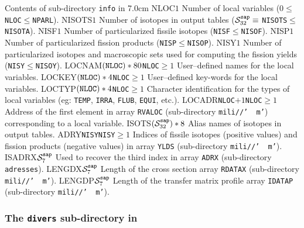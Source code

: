 \begin{DescriptionEnregistrement}{Contents of sub-directory {\tt info} in }{7.0cm}
\IntEnr
  {NLOC}{$1$}
  {Number of local variables ($0\le${\tt NLOC}$\le${\tt NPARL}).}
\IntEnr
  {NISOTS}{$1$}
  {Number of isotopes in output tables ($\mathcal{S}^{\tt sap}_{32}\equiv$ {\tt NISOTS}$\le${\tt NISOTA}).}
\IntEnr
  {NISF}{$1$}
  {Number of particularized fissile isotopes ({\tt NISF}$\le${\tt NISOF}).}
\IntEnr
  {NISP}{$1$}
  {Number of particularized fission products ({\tt NISP}$\le${\tt NISOP}).}
\IntEnr
  {NISY}{$1$}
  {Number of particularized isotopes and macroscopic sets used for computing the fission
  yields ({\tt NISY}$\le${\tt NISOY}).}
\OptCharEnr
  {LOCNAM}{$({\tt NLOC})*80$}{{\tt NLOC}$\ge 1$}
  {User--defined names for the local variables.}
\OptCharEnr
  {LOCKEY}{$({\tt NLOC})*4$}{{\tt NLOC}$\ge 1$}
  {User--defined key-words for the local variables.}
\OptCharEnr
  {LOCTYP}{$({\tt NLOC})*4$}{{\tt NLOC}$\ge 1$}
  {Character identification for the types of local variables (eg: {\tt TEMP}, {\tt IRRA}, {\tt FLUB},
  {\tt EQUI}, etc.).}
\OptIntEnr
  {LOCADR}{{\tt NLOC}$+1$}{{\tt NLOC}$\ge 1$}
  {Address of the first element in array {\tt RVALOC} (sub-directory {\tt mili//'~~m'}) corresponding
  to a local variable.}
\CharEnr
  {ISOTS}{$(\mathcal{S}^{\tt sap}_{32})*8$}
  {Alias names of isotopes in output tables.}
\OptIntEnr
  {ADRY}{{\tt NISY}}{{\tt NISY}$\ge 1$}
  {Indices of fissile isotopes (positive values) and fission products (negative values) in array
  {\tt YLDS} (sub-directory {\tt mili//'~~m'}).}
\IntEnr
  {ISADRX}{$\mathcal{S}^{\tt sap}_7$}
  {Used to recover the third index in array {\tt ADRX} (sub-directory {\tt adresses}).}
\IntEnr
  {LENGDX}{$\mathcal{S}^{\tt sap}_7$}
  {Length of the cross section array {\tt RDATAX} (sub-directory {\tt mili//'~~m'}).}
\IntEnr
  {LENGDP}{$\mathcal{S}^{\tt sap}_7$}
  {Length of the transfer matrix profile array {\tt IDATAP} (sub-directory {\tt mili//'~~m'}).}
\end{DescriptionEnregistrement}

\subsubsection{The {\tt divers} sub-directory in }\label{sect:sapdirdiv}

\vskip -0.5cm

